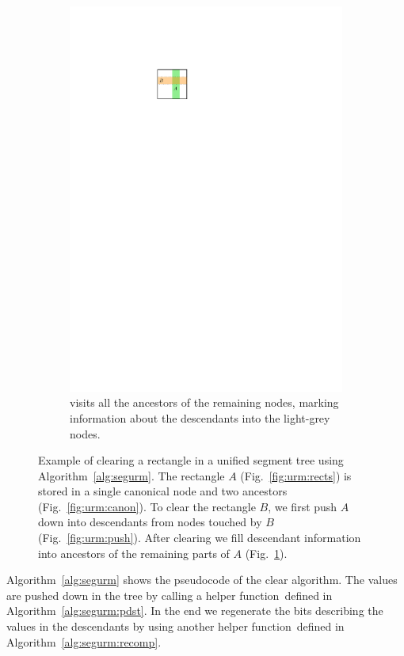 \documentclass[english,gradu]{tktltiki2018}
\begin{document}
\begin{figure}
\begin{subfigure}[t]{0.4\textwidth}
		\includegraphics[width=\textwidth,page=5]{fig/uremove}
		\caption{\recomp visits all the ancestors of the remaining nodes, marking information about the descendants into the light-grey nodes.}\label{fig:urm:recomp}
	\end{subfigure}
	\caption{
	Example of clearing a rectangle in a unified segment tree using Algorithm~\ref{alg:segurm}.
	The rectangle $A$ (Fig.~\ref{fig:urm:rects}) is stored in a single canonical node and two ancestors (Fig.~\ref{fig:urm:canon}).
	To clear the rectangle $B$, we first push $A$ down into descendants from nodes touched by $B$ (Fig.~\ref{fig:urm:push}).
	After clearing we fill descendant information into ancestors of the remaining parts of $A$ (Fig.~\ref{fig:urm:recomp}).
	}\label{fig:uremove}
\end{figure}

Algorithm~\ref{alg:segurm} shows the pseudocode of the clear algorithm.
The values are pushed down in the tree by calling a helper function~\pdst defined in Algorithm~\ref{alg:segurm:pdst}.
In the end we regenerate the bits describing the values in the descendants by using another helper function~\recomp defined in Algorithm~\ref{alg:segurm:recomp}.
\end{document}
